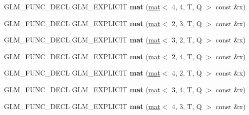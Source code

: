 \begin{DoxyCompactItemize}
G\+L\+M\+\_\+\+F\+U\+N\+C\+\_\+\+D\+E\+CL G\+L\+M\+\_\+\+E\+X\+P\+L\+I\+C\+IT {\bfseries mat} (\hyperlink{structglm_1_1mat}{mat}$<$ 4, 4, T, Q $>$ const \&x)
\item 
\mbox{\label{structglm_1_1mat_3_012_00_012_00_01T_00_01Q_01_4_a3805dc0834cd1ca5881c78e7a9eae6df}} 
G\+L\+M\+\_\+\+F\+U\+N\+C\+\_\+\+D\+E\+CL G\+L\+M\+\_\+\+E\+X\+P\+L\+I\+C\+IT {\bfseries mat} (\hyperlink{structglm_1_1mat}{mat}$<$ 2, 3, T, Q $>$ const \&x)
\item 
\mbox{\label{structglm_1_1mat_3_012_00_012_00_01T_00_01Q_01_4_ad9442dc86527c5722285dad5a836ff29}} 
G\+L\+M\+\_\+\+F\+U\+N\+C\+\_\+\+D\+E\+CL G\+L\+M\+\_\+\+E\+X\+P\+L\+I\+C\+IT {\bfseries mat} (\hyperlink{structglm_1_1mat}{mat}$<$ 3, 2, T, Q $>$ const \&x)
\item 
\mbox{\label{structglm_1_1mat_3_012_00_012_00_01T_00_01Q_01_4_a7ebe9ddac5439bad28a7c11e4c88c429}} 
G\+L\+M\+\_\+\+F\+U\+N\+C\+\_\+\+D\+E\+CL G\+L\+M\+\_\+\+E\+X\+P\+L\+I\+C\+IT {\bfseries mat} (\hyperlink{structglm_1_1mat}{mat}$<$ 2, 4, T, Q $>$ const \&x)
\item 
\mbox{\label{structglm_1_1mat_3_012_00_012_00_01T_00_01Q_01_4_af3679a2381e37613ba2d030cb30d4f69}} 
G\+L\+M\+\_\+\+F\+U\+N\+C\+\_\+\+D\+E\+CL G\+L\+M\+\_\+\+E\+X\+P\+L\+I\+C\+IT {\bfseries mat} (\hyperlink{structglm_1_1mat}{mat}$<$ 4, 2, T, Q $>$ const \&x)
\item 
\mbox{\label{structglm_1_1mat_3_012_00_012_00_01T_00_01Q_01_4_a800c559e22a085811de9a90ca8664506}} 
G\+L\+M\+\_\+\+F\+U\+N\+C\+\_\+\+D\+E\+CL G\+L\+M\+\_\+\+E\+X\+P\+L\+I\+C\+IT {\bfseries mat} (\hyperlink{structglm_1_1mat}{mat}$<$ 3, 4, T, Q $>$ const \&x)
\item 
\mbox{\label{structglm_1_1mat_3_012_00_012_00_01T_00_01Q_01_4_a81d53c3ee8acc014cf6cc01b7d6db832}} 
G\+L\+M\+\_\+\+F\+U\+N\+C\+\_\+\+D\+E\+CL G\+L\+M\+\_\+\+E\+X\+P\+L\+I\+C\+IT {\bfseries mat} (\hyperlink{structglm_1_1mat}{mat}$<$ 4, 3, T, Q $>$ const \&x)
\item 

\end{DoxyCompactItemize}
